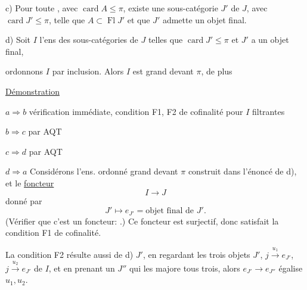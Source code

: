 c) Pour toute  , avec $\operatorname{card}A\leq\pi$, existe une sous-catégorie $J'$ de $J$, avec $\operatorname{card}J'\leq\pi$, telle que $A\subset\operatorname{Fl}J'$ et que $J'$ admette un objet final.

d) Soit $I$ l'ens des sous-catégories  de $J$ telles que $\operatorname{card}J'\leq\pi$ et $J'$ a un objet final,

ordonnons $I$ par inclusion. Alors $I$ est grand devant $\pi$, de plus   

\uline{Démonstration}

$a\Longrightarrow b$ vérification immédiate,    condition F1, F2 de cofinalité pour  $I$ filtrantes

$b\Longrightarrow c$ par AQT

$c\Longrightarrow d$ par AQT

$d\Longrightarrow a$ Considérons l'ens. ordonné grand devant $\pi$ construit dans l'énoncé de d), et le \uline{foncteur}
\[
I\longrightarrow J
\]
donné par
\[
J'\longmapsto e_{J'}=\text{objet final de }J'.
\]
(Vérifier que c'est un foncteur: .) Ce foncteur est surjectif, donc satisfait la condition F1 de cofinalité.

La condition F2 résulte aussi de d)
$J'$, en regardant les trois objets $J'$, $j\xrightarrow{u_1}e_{J'}$, $j\xrightarrow{u_2}e_{J'}$ de $I$, et en prenant un $J''$ qui les majore tous trois, alors $e_{J'}\longrightarrow e_{J''}$ égalise $u_1,u_2$.

